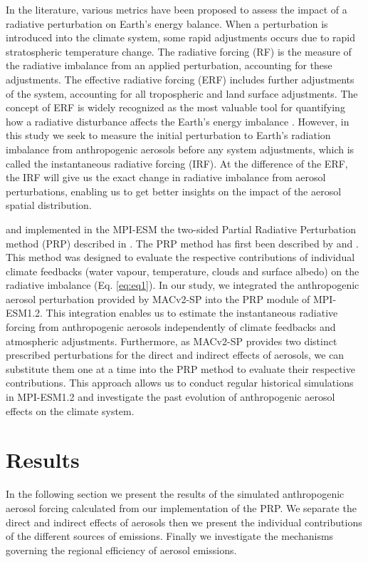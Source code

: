 \documentclass[draft]{agujournal2019}
\begin{document}
      In the literature, various metrics have been proposed to assess the impact of a radiative perturbation on Earth's energy balance. When a perturbation is introduced into the climate system, some rapid adjustments occurs due to rapid stratospheric temperature change. The radiative forcing (RF) is the measure of the radiative imbalance from an applied perturbation, accounting for these adjustments. The effective radiative forcing (ERF) includes further adjustments of the system, accounting for all tropospheric and land surface adjustments. The concept of ERF is widely recognized as the most valuable tool for quantifying how a radiative disturbance affects the Earth's energy imbalance \cite{Myhre_2013,Boucher_2013,Forster_2016}. However, in this study we seek to measure the initial perturbation to Earth's radiation imbalance from anthropogenic aerosols before any system adjustments, which is called the instantaneous radiative forcing (IRF). At the difference of the ERF, the IRF will give us the exact change in radiative imbalance from aerosol perturbations, enabling us to get better insights on the impact of the aerosol spatial distribution.

       and  implemented in the MPI-ESM the two-sided Partial Radiative Perturbation method (PRP) described in . The PRP method has first been described by  and . This method was designed to evaluate the respective contributions of individual climate feedbacks (water vapour, temperature, clouds and surface albedo) on the radiative imbalance (Eq. \ref{eq:eq1}). In our study, we integrated the anthropogenic aerosol perturbation provided by MACv2-SP into the PRP module of MPI-ESM1.2. This integration enables us to estimate the instantaneous radiative forcing from anthropogenic aerosols independently of climate feedbacks and atmospheric adjustments. Furthermore, as MACv2-SP provides two distinct prescribed perturbations for the direct and indirect effects of aerosols, we can substitute them one at a time into the PRP method to evaluate their respective contributions. This approach allows us to conduct regular historical simulations in MPI-ESM1.2 and investigate the past evolution of anthropogenic aerosol effects on the climate system.

\section{Results}
      In the following section we present the results of the simulated anthropogenic aerosol forcing calculated from our implementation of the PRP. We separate the direct and indirect effects of aerosols then we present the individual contributions of the different sources of emissions. Finally we investigate the mechanisms governing the regional efficiency of aerosol emissions.
\end{document}
